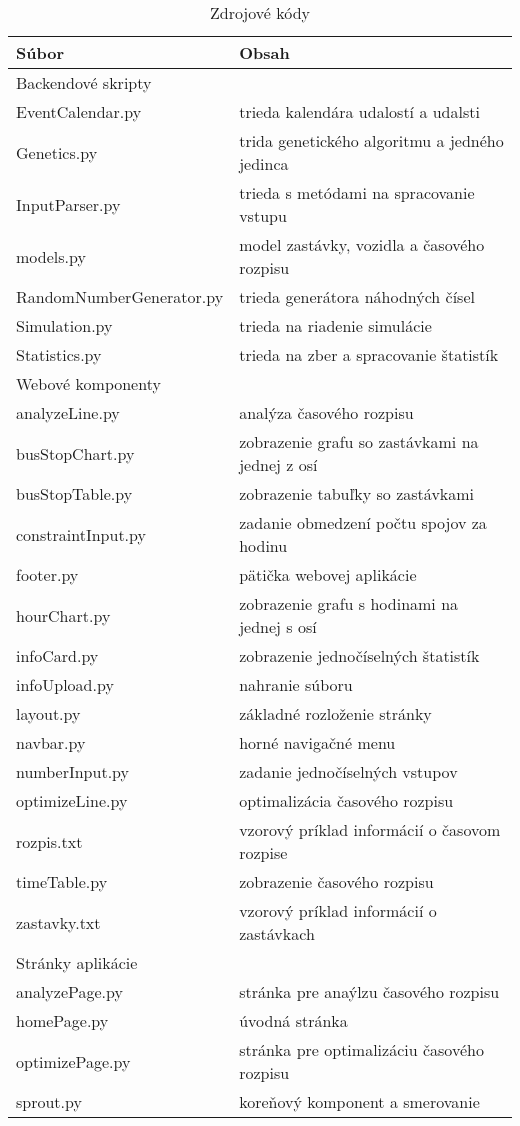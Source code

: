 \begin{table}[h]\label{tab:source_codes}
  \centering
  \begin{tabularx}{\textwidth}{|l|X|}
    \hline
    \textbf{Súbor} & \textbf{Obsah} \\ \hline
    Backendové skripty & \\
    EventCalendar.py & trieda kalendára udalostí a udalsti \\
    Genetics.py & trida genetického algoritmu a jedného jedinca \\
    InputParser.py & trieda s metódami na spracovanie vstupu \\
    models.py &  model zastávky, vozidla a časového rozpisu\\
    RandomNumberGenerator.py & trieda generátora náhodných čísel \\
    Simulation.py & trieda na riadenie simulácie \\
    Statistics.py & trieda na zber a spracovanie štatistík \\ \hline
    Webové komponenty & \\
    analyzeLine.py & analýza časového rozpisu \\
    busStopChart.py & zobrazenie grafu so zastávkami na jednej z osí \\
    busStopTable.py &zobrazenie tabuľky so zastávkami \\
    constraintInput.py & zadanie obmedzení počtu spojov za hodinu \\
    footer.py & pätička webovej aplikácie \\
    hourChart.py & zobrazenie grafu s hodinami na jednej s osí \\
    infoCard.py & zobrazenie jednočíselných štatistík \\
    infoUpload.py & nahranie súboru \\
    layout.py & základné rozloženie stránky \\
    navbar.py & horné navigačné menu \\
    numberInput.py & zadanie jednočíselných vstupov \\
    optimizeLine.py & optimalizácia časového rozpisu \\
    rozpis.txt & vzorový príklad informácií o časovom rozpise \\
    timeTable.py & zobrazenie časového rozpisu \\
    zastavky.txt & vzorový príklad informácií o zastávkach \\ \hline
    Stránky aplikácie & \\
    analyzePage.py & stránka pre anaýlzu časového rozpisu \\
    homePage.py & úvodná stránka \\
    optimizePage.py & stránka pre optimalizáciu časového rozpisu \\ \hline
    sprout.py & koreňový komponent a smerovanie \\ \hline
  \end{tabularx}
  \caption{Zdrojové kódy}
\end{table}

